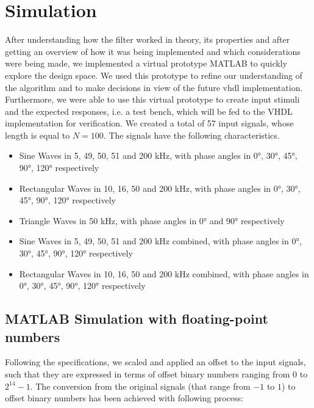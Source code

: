 \section{Simulation}
\label{sec:simulation}
After understanding how the filter worked in theory, its properties and after getting an overview of how it was being implemented and which considerations were being made, we implemented a virtual prototype MATLAB to quickly explore the design space. We used this prototype to refine our understanding of the algorithm and to make decisions in view of the future vhdl implementation. Furthermore, we were able to use this virtual prototype to create input stimuli and the expected responses, i.e. a test bench, which will be fed to the VHDL implementation for verification.
We created a total of 57 input signals, whose length is equal to $N = 100$. The signals have the following characteristics.
\begin{itemize}
    \item Sine Waves in 5, 49, 50, 51 and 200 kHz, with phase angles in 0°, 30°, 45°, 90°, 120° respectively
    \item Rectangular Waves in 10, 16, 50 and 200 kHz, with phase angles in 0°, 30°, 45°, 90°, 120° respectively
    \item Triangle Waves in 50 kHz, with phase angles in 0° and 90° respectively
    \item Sine Waves in 5, 49, 50, 51 and 200 kHz combined, with phase angles in 0°, 30°, 45°, 90°, 120° respectively
    \item Rectangular Waves in 10, 16, 50 and 200 kHz combined, with phase angles in 0°, 30°, 45°, 90°, 120° respectively
\end{itemize}

\subsection{MATLAB Simulation with floating-point numbers}  \label{sec:matlab-float}

Following the specifications, we scaled and applied an offset to the input signals, such that they are expressed in terms of offset binary numbers ranging from $0$ to $2^{14} - 1$. The conversion from the original signals (that range from $-1$ to $1$) to offset binary numbers has been achieved with following process:

